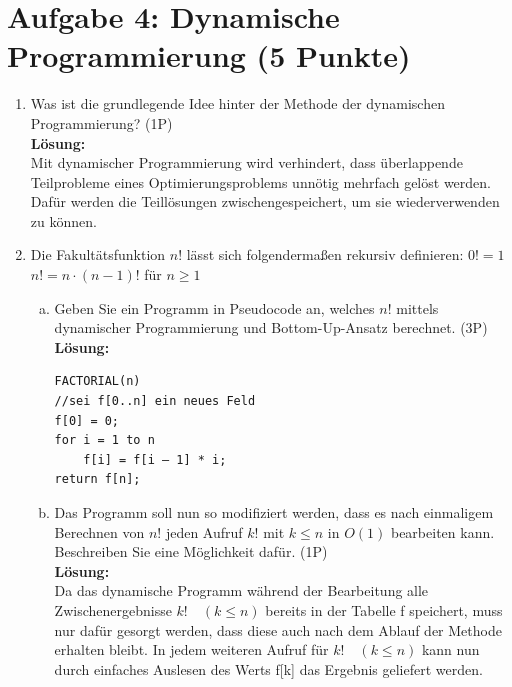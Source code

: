 \documentclass{scrartcl}
\begin{document}
\section*{Aufgabe 4: Dynamische Programmierung (5 Punkte)}
\begin{enumerate}[(1)]

\item Was ist die grundlegende Idee hinter der Methode der dynamischen Programmierung? (1P)\\
\textbf{Lösung:}\\
Mit dynamischer Programmierung wird verhindert, dass überlappende Teilprobleme eines Optimierungsproblems unnötig mehrfach gelöst werden. Dafür werden die Teillösungen zwischengespeichert, um sie wiederverwenden zu können.

\item Die Fakultätsfunktion $n!$ lässt sich folgendermaßen rekursiv definieren: \newline
$0! = 1$\newline
$n! = n\cdot(n-1)!$ 	für $n \geq 1$
\begin{enumerate}[(a)]
\item Geben Sie ein Programm in Pseudocode an, welches $n!$  mittels dynamischer Programmierung und Bottom-Up-Ansatz berechnet. (3P)\\
\textbf{Lösung:}\\
\begin{verbatim}FACTORIAL(n)
//sei f[0..n] ein neues Feld
f[0] = 0;
for i = 1 to n
    f[i] = f[i – 1] * i;
return f[n];
\end{verbatim}
\item Das Programm soll nun so modifiziert werden, dass es nach einmaligem Berechnen von $n!$ jeden Aufruf $k!$ mit $k \leq n$ in $O(1)$ bearbeiten kann. Beschreiben Sie eine Möglichkeit dafür. (1P)\\
\textbf{Lösung:}\\
Da das dynamische Programm während der Bearbeitung alle Zwischenergebnisse $k!\quad (k \leq n)$ bereits in der Tabelle f speichert, muss nur dafür gesorgt werden, dass diese auch nach dem Ablauf der Methode erhalten bleibt. In jedem weiteren Aufruf für $k!\quad (k \leq n)$ kann nun durch einfaches Auslesen des Werts f[k] das Ergebnis geliefert werden.
\end{enumerate}
\end{enumerate}
\end{document}
